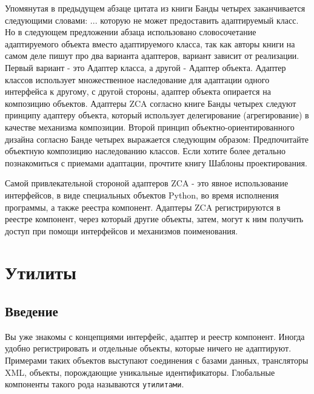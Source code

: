 \documentclass[a4paper,openany,twoside,final]{book}
\begin{document}
Упомянутая в предыдущем абзаце цитата из книги Банды четырех
заканчивается следующими словами: \textquotedbl{} ... которую не может предоставить
адаптируемый класс\textquotedbl{}.  Но в следующем предложении абзаца использовано
словосочетание \textquotedbl{}адаптируемого объекта\textquotedbl{} вместо \textquotedbl{}адаптируемого класса\textquotedbl{},
так как авторы книги на самом деле пишут про два варианта адаптеров,
вариант зависит от реализации.  Первый вариант - это \textquotedbl{}Адаптер класса\textquotedbl{},
а другой - \textquotedbl{}Адаптер объекта\textquotedbl{}.  Адаптер классов использует
множественное наследование для адаптации одного интерфейса к другому,
с другой стороны, адаптер объекта опирается на композицию объектов.
Адаптеры ZCA согласно книге Банды четырех следуют принципу адаптеру
объекта, который использует делегирование (агрегирование) в качестве
механизма композиции.  Второй принцип объектно-ориентированного
дизайна согласно Банде четырех выражается следующим образом:
\textquotedbl{}Предпочитайте объектную композицию наследованию классов\textquotedbl{}.  Если
хотите более детально познакомиться с приемами адаптации, прочтите
книгу \textquotedbl{}Шаблоны проектирования\textquotedbl{}.

Самой привлекательной стороной адаптеров ZCA - это явное использование
интерфейсов, в виде специальных объектов Python, во время исполнения
программы, а также реестра компонент.  Адаптеры ZCA регистрируются в
реестре компонент, через который другие объекты, затем, могут к ним
получить доступ при помощи интерфейсов и механизмов поименования.


\chapter{Утилиты%
  \label{id39}%
}


\section{Введение%
  \label{id40}%
}

Вы уже знакомы с концепциями \textquotedbl{}интерфейс\textquotedbl{}\textquotedbl{}, \textquotedbl{}адаптер\textquotedbl{} и \textquotedbl{}реестр
компонент\textquotedbl{}.  Иногда удобно регистрировать и отдельные объекты, которые
ничего не адаптируют.  Примерами таких объектов выступают соединения с
базами данных, трансляторы XML, объекты, порождающие уникальные
идентификаторы.  Глобальные компоненты такого рода называются
\texttt{утилитами}.
\end{document}
